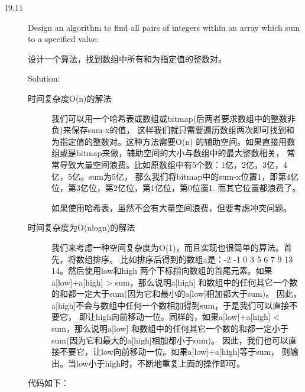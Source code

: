 \begin{description}
\item[19.11] Design an algorithm to find all pairs of integers within an array which sum to a specified value.

设计一个算法，找到数组中所有和为指定值的整数对。

Solution: 
\begin{description}
\item[时间复杂度O(n)的解法] 我们可以用一个哈希表或数组或bitmap(后两者要求数组中的整数非负)来保存sum-x的值， 这样我们就只需要遍历数组两次即可找到和为指定值的整数对。这种方法需要O(n) 的辅助空间。如果直接用数组或是bitmap来做，辅助空间的大小与数组中的最大整数相关， 常常导致大量空间浪费。比如原数组中有5个数：1亿，2亿，3亿，4亿，5亿。sum为5亿， 那么我们将bitmap中的sum-x位置1，即第4亿位，第3亿位，第2亿位，第1亿位，第0位置1. 而其它位置都浪费了。

如果使用哈希表，虽然不会有大量空间浪费，但要考虑冲突问题。

\item[时间复杂度为O(nlogn)的解法] 我们来考虑一种空间复杂度为O(1)，而且实现也很简单的算法。首先，将数组排序。 比如排序后得到的数组a是：-2 -1 0 3 5 6 7 9 13 14。然后使用low和high 两个下标指向数组的首尾元素。如果a[low]+a[high] > sum，那么说明a[high] 和数组中的任何其它一个数的和都一定大于sum(因为它和最小的a[low]相加都大于sum)。 因此，a[high]不会与数组中任何一个数相加得到sum，于是我们可以直接不要它， 即让high向前移动一位。同样的，如果a[low]+a[high] < sum，那么说明a[low] 和数组中的任何其它一个数的和都一定小于sum(因为它和最大的a[high]相加都小于sum)。 因此，我们也可以直接不要它，让low向前移动一位。如果a[low]+a[high]等于sum， 则输出。当low小于high时，不断地重复上面的操作即可。
\end{description}
代码如下：


\end{description}
